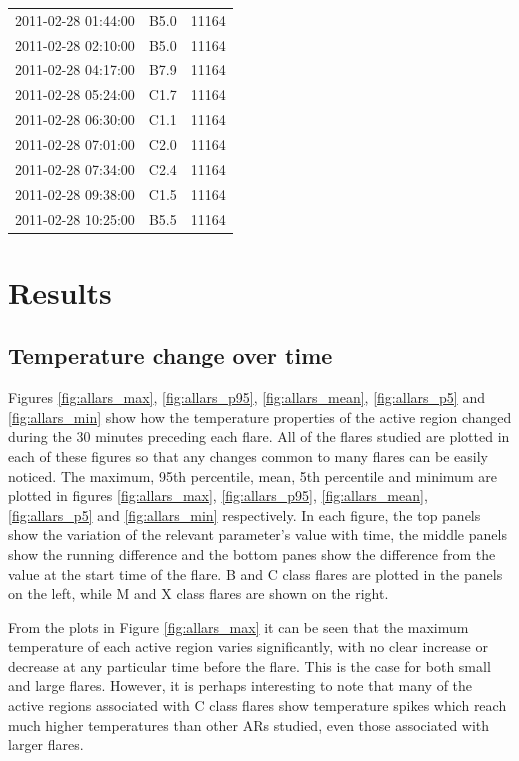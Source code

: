 \documentclass[referee,a4paper,12pt]{swsc}
\begin{document}
\begin{linenumbers}
\begin{longtable}{c|c|c}
		2011-02-28 01:44:00 & B5.0 & 11164 \\ 
		2011-02-28 02:10:00 & B5.0 & 11164 \\ 
		2011-02-28 04:17:00 & B7.9 & 11164 \\ 
		2011-02-28 05:24:00 & C1.7 & 11164 \\ 
		2011-02-28 06:30:00 & C1.1 & 11164 \\ 
		2011-02-28 07:01:00 & C2.0 & 11164 \\ 
		2011-02-28 07:34:00 & C2.4 & 11164 \\ 
		2011-02-28 09:38:00 & C1.5 & 11164 \\ 
		2011-02-28 10:25:00 & B5.5 & 11164
	\label{tab:flares}
\end{longtable}

\section{Results}
\subsection{Temperature change over time}
Figures \ref{fig:allars_max}, \ref{fig:allars_p95}, \ref{fig:allars_mean}, \ref{fig:allars_p5} and \ref{fig:allars_min} show how the temperature properties of the active region changed during the 30 minutes preceding each flare.
All of the flares studied are plotted in each of these figures so that any changes common to many flares can be easily noticed.
The maximum, 95th percentile, mean, 5th percentile and minimum are plotted in figures \ref{fig:allars_max}, \ref{fig:allars_p95}, \ref{fig:allars_mean}, \ref{fig:allars_p5} and \ref{fig:allars_min} respectively.
In each figure, the top panels show the variation of the relevant parameter's value with time, the middle panels show the running difference and the bottom panes show the difference from the value at the start time of the flare.
B and C class flares are plotted in the panels on the left, while M and X class flares are shown on the right.

From the plots in Figure \ref{fig:allars_max} it can be seen that the maximum temperature of each active region varies significantly, with no clear increase or decrease at any particular time before the flare.
This is the case for both small and large flares.
However, it is perhaps interesting to note that many of the active regions associated with C class flares show temperature spikes which reach much higher temperatures than other ARs studied, even those associated with larger flares.


\end{linenumbers}
\end{document}
